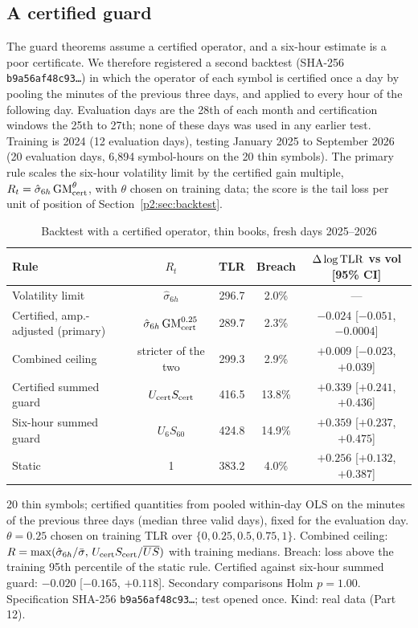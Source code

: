\subsection{A certified guard}\label{p2:sec:certguard}
The guard theorems assume a certified operator, and a six-hour estimate is a poor certificate. We therefore registered a second backtest (SHA-256 \texttt{b9a56af48c93\ldots}) in which the operator of each symbol is certified once a day by pooling the minutes of the previous three days, and applied to every hour of the following day. Evaluation days are the 28th of each month and certification windows the 25th to 27th; none of these days was used in any earlier test. Training is 2024 (12 evaluation days), testing January 2025 to September 2026 (20 evaluation days, 6{,}894 symbol-hours on the 20 thin symbols). The primary rule scales the six-hour volatility limit by the certified gain multiple, $R_t=\hat\sigma_{6h}\,{\rm GM}_{\rm cert}^{\theta}$, with $\theta$ chosen on training data; the score is the tail loss per unit of position of Section~\ref{p2:sec:backtest}.

\begin{table}[t]\centering\small
\begin{threeparttable}
\caption{Backtest with a certified operator, thin books, fresh days 2025--2026}\label{p2:tab:certguard}
\setlength{\tabcolsep}{3pt}
\begin{tabular}{lcccc}
\toprule
Rule & $R_t$ & TLR & Breach & $\Delta\log{\rm TLR}$ vs vol [95\% CI]\\
\midrule
Volatility limit & $\hat\sigma_{6h}$ & 296.7 & 2.0\% & ---\\
Certified, amp.-adjusted (primary) & $\hat\sigma_{6h}\,{\rm GM}_{\rm cert}^{0.25}$ & 289.7 & 2.3\% & $-0.024$ [$-0.051$, $-0.0004$]\\
Combined ceiling & stricter of the two & 299.3 & 2.9\% & $+0.009$ [$-0.023$, $+0.039$]\\
Certified summed guard & $U_{\rm cert}S_{\rm cert}$ & 416.5 & 13.8\% & $+0.339$ [$+0.241$, $+0.436$]\\
Six-hour summed guard & $U_6S_{60}$ & 424.8 & 14.9\% & $+0.359$ [$+0.237$, $+0.475$]\\
Static & 1 & 383.2 & 4.0\% & $+0.256$ [$+0.132$, $+0.387$]\\
\bottomrule
\end{tabular}
\begin{tablenotes}\footnotesize\item 20 thin symbols; certified quantities from pooled within-day OLS on the minutes of the previous three days (median three valid days), fixed for the evaluation day. $\theta=0.25$ chosen on training TLR over $\{0,0.25,0.5,0.75,1\}$. Combined ceiling: $R=\max(\hat\sigma_{6h}/\bar\sigma,\,U_{\rm cert}S_{\rm cert}/\overline{US})$ with training medians. Breach: loss above the training 95th percentile of the static rule. Certified against six-hour summed guard: $-0.020$ [$-0.165$, $+0.118$]. Secondary comparisons Holm $p=1.00$. Specification SHA-256 \texttt{b9a56af48c93\ldots}; test opened once. Kind: real data (Part 12).\end{tablenotes}
\end{threeparttable}
\end{table}

